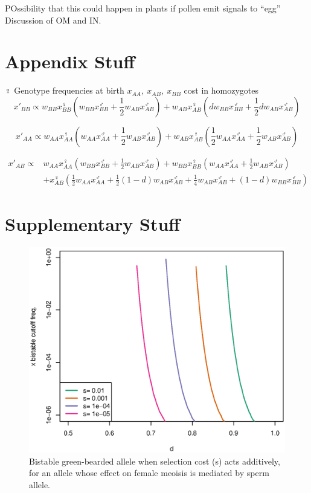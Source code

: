 \documentclass[12pt,letterpaper]{article}
\begin{document}
 
 
POssibility that this could happen in plants if pollen emit signals to ``egg''
Discussion of OM and IN.

\section*{Appendix Stuff}
$\Venus$
Genotype frequencies at birth $x_{AA},~x_{AB},~x_{BB}$ cost in
homozygotes 
\begin{equation}
x'_{BB} \propto w_{BB} x_{BB}^{\Venus} (w_{BB} x_{BB}^{\Mars} +\frac{1}{2}
  w_{AB} x_{AB}^{\Mars} ) + w_{AB} x_{AB}^{\Venus} (d w_{BB}
  x_{BB}^{\Mars} +\frac{1}{2} d
w_{AB} x_{AB}^{\Mars} )  
\end{equation}



\begin{equation}
x'_{AA} \propto w_{AA} x_{AA}^{\Venus} (w_{AA} x_{AA}^{\Mars} + \frac{1}{2}
   w_{AB} x_{AB}^{\Mars}) + w_{AB} x_{AB}^{\Venus}(\frac{1}{2} w_{AA} x_{AA}^{\Mars}+ \frac{1}{2} 
  w_{AB} x_{AB}^{\Mars}) 
\end{equation}


\begin{eqnarray}
x'_{AB} \propto  & w_{AA} x_{AA}^{\Venus}  ( w_{BB}  x_{BB}^{\Mars} + \frac{1}{2}
  w_{AB}  x_{AB}^{\Mars} ) +w_{BB} x_{BB}^{\Venus} ( w_{AA}  x_{AA}^{\Mars} + \frac{1}{2}
  w_{AB}  x_{AB}^{\Mars} )  \nonumber \\
& + x_{AB}^{\Venus}(\frac{1}{2}  w_{AA}  x_{AA}^{\Mars}+\frac{1}{2} (1-d)
 w_{AB}  x_{AB}^{\Mars} + \frac{1}{4}  w_{AB}
 x_{AB}^{\Mars} + (1-d)  w_{BB}  x_{BB}^{\Mars} ) 
\end{eqnarray}



\section*{Supplementary Stuff}

\begin{figure}
\includegraphics[width = 0.8 \textwidth]{Figures/bistable_x_vs_d_additive_s.eps} 
\caption{Bistable green-bearded allele when selection cost (s) acts
  additively, for an allele whose effect
 on female meoisis is mediated by sperm allele. }  \label{bistable_additive}
\end{figure}
\end{document}
